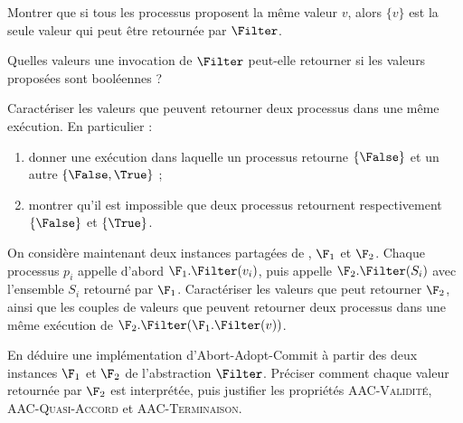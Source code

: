 \begin{exercice}
\begin{questions}
  \item Montrer que si tous les processus proposent la même valeur $v$,
    alors $\{v\}$ est la seule valeur qui peut être retournée par $\Filter$.

  \item Quelles valeurs une invocation de $\Filter$ peut-elle retourner si les valeurs proposées sont booléennes ?

  \item Caractériser les valeurs que peuvent retourner deux processus dans une même exécution.
    En particulier :
    \begin{enumerate}
    \item donner une exécution dans laquelle un processus retourne $\{\False\}$
      et un autre $\{\False, \True\}$ ;
    \item montrer qu'il est impossible que deux processus retournent
      respectivement $\{\False\}$ et $\{\True\}$.
    \end{enumerate}

  \item On considère maintenant deux instances partagées de \Filter, $\F_1$ et $\F_2$.
    Chaque processus $p_i$ appelle d'abord $\F_1.\Filter(v_i)$, puis appelle
    $\F_2.\Filter(S_i)$ avec l'ensemble $S_i$ retourné par $\F_1$.
    Caractériser les valeurs que peut retourner $\F_2$, ainsi que les couples
    de valeurs que peuvent retourner deux processus dans une même exécution
    de $\F_2.\Filter(\F_1.\Filter(v))$.

  \item En déduire une implémentation d'Abort-Adopt-Commit à partir des deux
    instances $\F_1$ et $\F_2$ de l'abstraction $\Filter$.
    Préciser comment chaque valeur retournée par $\F_2$ est interprétée,
    puis justifier les propriétés \textsc{AAC-Validité},
    \textsc{AAC-Quasi-Accord} et \textsc{AAC-Terminaison}.
    
  \end{questions}

\end{exercice}

    


